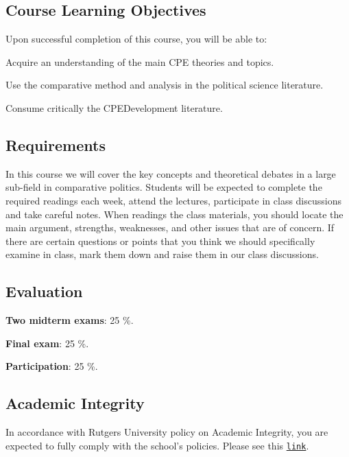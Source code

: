 \documentclass[letterpaper]{article}
\renewenvironment{itemize}{
  \begin{list}{}{
    \setlength{\leftmargin}{1.5em}
  }
}{
  \end{list}
}
\begin{document}
\subsection*{Course Learning Objectives}
 
Upon successful completion of this course, you will be able to:

\begin{itemize}
	\item[$\bullet$] Acquire an understanding of the main CPE theories and topics.
	\item[$\bullet$] Use the comparative method and analysis in the political science literature.
	\item[$\bullet$] Consume critically the CPE\/Development literature.
\end{itemize}



\subsection*{Requirements}

In this course we will cover the key concepts and theoretical debates in a large sub-field in comparative politics. Students will be expected to complete the required readings each week, attend the lectures, participate in class discussions and take careful notes. When readings the class materials, you should locate the main argument, strengths, weaknesses, and other issues that are of concern. If there are certain questions or points that you think we should specifically examine in class, mark them down and raise them in our class discussions.

\subsection*{Evaluation}


\begin{itemize}
	\item[$\bullet$] {\bf Two midterm exams}: 25 \%.
	\item[$\bullet$] {\bf Final exam}: 25 \%.
	\item[$\bullet$] {\bf Participation}: 25 \%.
\end{itemize}


\subsection*{Academic Integrity}
In accordance with Rutgers University policy on Academic Integrity, you are expected to fully comply with the school’s policies.  Please see this \href{http://academicintegrity.rutgers.edu}{\texttt{link}}.
\end{document}
